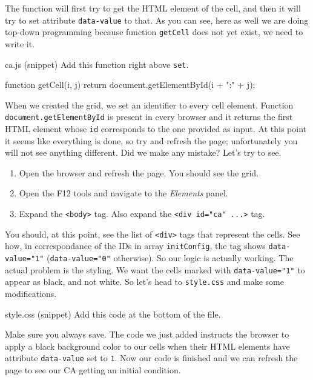 The function will first try to get the HTML element of the cell, and then it will try to set attribute
\texttt{data-value} to that. As you can see, here as well we are doing top-down programming because
function \texttt{getCell} does not yet exist, we need to write it.

\begin{programcode}{ca.js (snippet)}
Add this function right above \texttt{set}.
\begin{code}
function getCell(i, j) {
  return document.getElementById(i + ":" + j);
}
\end{code}
\end{programcode}

When we created the grid, we set an identifier to every cell element. Function \texttt{document.getElementById}
is present in every browser and it returns the first HTML element whose \texttt{id} corresponds to the one
provided as input. At this point it seems like everything is done, so try and refresh the page; unfortunately
you will not see anything different. Did we make any mistake? Let's try to see.

\begin{enumerate}
\item Open the browser and refresh the page. You should see the grid.
\item Open the F12 tools and navigate to the \textit{Elements} panel.
\item Expand the \texttt{<body>} tag. Also expand the \texttt{<div id="ca" ...>} tag.
\end{enumerate}

You should, at this point, see the list of \texttt{<div>} tags that represent the cells. See how, in correspondance
of the IDs in array \texttt{initConfig}, the tag shows \texttt{data-value="1"} (\texttt{data-value="0"}
otherwise). So our logic is actually working. The actual problem is the styling. We want the cells marked with
\texttt{data-value="1"} to appear as black, and not white. So let's head to \texttt{style.css} and make some
modifications.

\begin{programcode}{style.css (snippet)}
Add this code at the bottom of the file.
\end{programcode}

Make sure you always save. The code we just added instructs the browser to apply a black background color
to our cells when their HTML elements have attribute \texttt{data-value} set to \texttt{1}.
Now our code is finished and we can refresh the page to see our CA getting an initial
condition.

